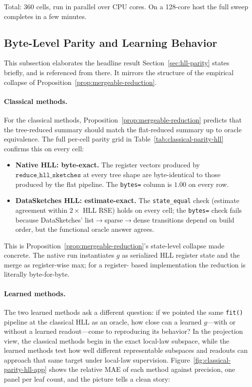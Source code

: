 Total: $360$ cells, run in parallel over CPU cores. On a 128-core host
the full sweep completes in a few minutes.

\subsection{Byte-Level Parity and Learning Behavior}\label{app:hll-empirical-collapse}

This subsection elaborates the headline result Section~\ref{sec:hll-parity}
states briefly, and is referenced from there. It mirrors the structure
of the empirical collapse of Proposition~\ref{prop:mergeable-reduction}.

\paragraph{Classical methods.}
For the classical methods, Proposition~\ref{prop:mergeable-reduction}
predicts that the tree-reduced summary should match the flat-reduced
summary up to oracle equivalence. The full per-cell parity grid in
Table~\ref{tab:classical-parity-hll} confirms this on every cell:

\begin{itemize}[leftmargin=1.5em]
    \item \textbf{Native HLL: byte-exact.} The register vectors
          produced by $\texttt{reduce\_hll\_sketches}$ at every tree
          shape are byte-identical to those produced by the flat
          pipeline. The \texttt{bytes=} column is $1.00$ on every row.
    \item \textbf{DataSketches HLL: estimate-exact.} The
          \texttt{state\_equal} check (estimate agreement within
          $2\times$ HLL RSE) holds on every cell; the \texttt{bytes=}
          check fails because DataSketches' list$\to$sparse$\to$dense
          transitions depend on build order, but the functional
          oracle answer agrees.
\end{itemize}

This is Proposition~\ref{prop:mergeable-reduction}'s state-level
collapse made concrete. The native run instantiates $g$ as serialized
HLL register state and the merge as register-wise max; for a register-
based implementation the reduction is literally byte-for-byte.

{\small

}

\paragraph{Learned methods.}
The two learned methods ask a different question: if we pointed the
same \texttt{fit()} pipeline at the classical HLL as an oracle, how
close can a learned $g$---with or without a learned readout---come to
reproducing its behavior? In the projection view, the classical
methods begin in the exact local-law subspace, while the learned
methods test how well different representable subspaces and readouts
can approach that same target under local-law supervision.
Figure~\ref{fig:classical-parity-hll-app} shows the relative MAE of each
method against precision, one panel per leaf count, and the picture
tells a clean story:

